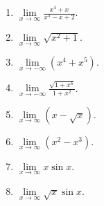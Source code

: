 \begin{multicols}{3}
\begin{enumerate}
\item $\displaystyle \lim\limits_{x\to\infty}\frac{x^4+x}{x^3-x+2}$.

\answer{$\infty$}
\item $\displaystyle \lim\limits_{x\to\infty}\sqrt{x^2+1}$.

\answer{$\infty$}
\item $\displaystyle \lim\limits_{x\to-\infty}(x^4+x^5)$.

\answer{$-\infty$}
\item $\displaystyle \lim\limits_{x\to-\infty}\frac{\sqrt{1+x^6}}{1+x^2}$.

\answer{$\infty$}
\item $\displaystyle \lim\limits_{x\to\infty}(x-\sqrt{x})$.

\answer{$\infty$}
\item $\displaystyle \lim\limits_{x\to\infty}(x^2-x^3)$.

\answer{$-\infty$}
\item $\displaystyle \lim\limits_{x\to\infty}x\sin x$.

\item $\displaystyle \lim\limits_{x\to\infty}\sqrt{x}\sin x$.

\end{enumerate}
\end{multicols}